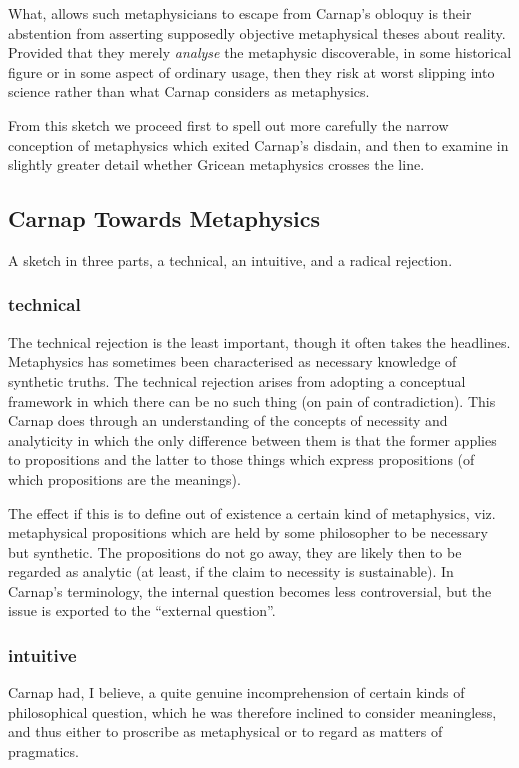 \documentclass[10pt,titlepage]{book}
\begin{document}
What, allows such metaphysicians to escape from Carnap's obloquy is their abstention from asserting supposedly objective metaphysical theses about reality.
Provided that they merely {\it analyse} the metaphysic discoverable, in some historical figure or in some aspect of ordinary usage, then they risk at worst slipping into science rather than what Carnap considers as metaphysics.

From this sketch we proceed first to spell out more carefully the narrow conception of metaphysics which exited Carnap's disdain, and then to examine in slightly greater detail whether Gricean metaphysics crosses the line.

\subsection{Carnap Towards Metaphysics}

A sketch in three parts, a technical, an intuitive, and a radical rejection.

\subsubsection{technical}
The technical rejection is the least important, though it often takes the headlines.
Metaphysics has sometimes been characterised as necessary knowledge of synthetic truths.
The technical rejection arises from adopting a conceptual framework in which there can be no such thing (on pain of contradiction).
This Carnap does through an understanding of the concepts of necessity and analyticity in which the only difference between them is that the former applies to propositions and the latter to those things which express propositions (of which propositions are the meanings).

The effect if this is to define out of existence a certain kind of metaphysics, viz. metaphysical propositions which are held by some philosopher to be necessary but synthetic.
The propositions do not go away, they are likely then to be regarded as analytic (at least, if the claim to necessity is sustainable).
In Carnap's terminology, the internal question becomes less controversial, but the issue is exported to the ``external question''.

\subsubsection{intuitive}
Carnap had, I believe, a quite genuine incomprehension of certain kinds of philosophical question, which he was therefore inclined to consider meaningless, and thus either to proscribe as metaphysical or to regard as matters of pragmatics.
\end{document}
